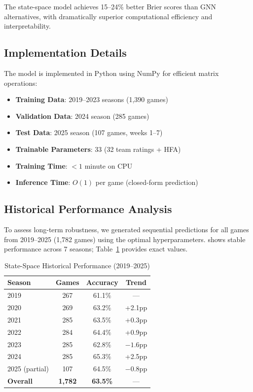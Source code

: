 The state-space model achieves 15--24\% better Brier scores than GNN alternatives, with dramatically superior computational efficiency and interpretability.

\subsection{Implementation Details}

The model is implemented in Python using NumPy for efficient matrix operations:

\begin{itemize}
    \item \textbf{Training Data}: 2019--2023 seasons (1,390 games)
    \item \textbf{Validation Data}: 2024 season (285 games)
    \item \textbf{Test Data}: 2025 season (107 games, weeks 1--7)
    \item \textbf{Trainable Parameters}: 33 (32 team ratings + HFA)
    \item \textbf{Training Time}: $<1$ minute on CPU
    \item \textbf{Inference Time}: $O(1)$ per game (closed-form prediction)
\end{itemize}

\subsection{Historical Performance Analysis}

To assess long-term robustness, we generated sequential predictions for all games from 2019--2025 (1,782 games) using the optimal hyperparameters.  shows stable performance across 7 seasons; Table~\ref{tab:state-space-by-season} provides exact values.



\begin{table}[h]
\centering
\caption{State-Space Historical Performance (2019--2025)}
\label{tab:state-space-by-season}
\begin{tabular}{lccc}
\toprule
\textbf{Season} & \textbf{Games} & \textbf{Accuracy} & \textbf{Trend} \\
\midrule
2019 & 267 & 61.1\% & --- \\
2020 & 269 & 63.2\% & +2.1pp \\
2021 & 285 & 63.5\% & +0.3pp \\
2022 & 284 & 64.4\% & +0.9pp \\
2023 & 285 & 62.8\% & $-1.6$pp \\
2024 & 285 & 65.3\% & +2.5pp \\
2025 (partial) & 107 & 64.5\% & $-0.8$pp \\
\midrule
\textbf{Overall} & \textbf{1,782} & \textbf{63.5\%} & --- \\
\bottomrule
\end{tabular}
\end{table}

